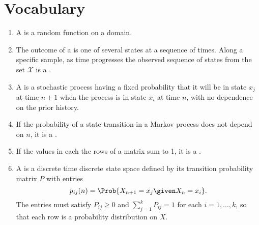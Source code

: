 \documentclass[12pt]{article}
\begin{document}
\section*{Vocabulary}
\begin{enumerate}
    \item
        A  is a random function on a domain.
    \item
        The outcome of a  is one of several states at a sequence of times.  Along
        a specific sample, as time progresses the observed sequence of
        states from the set \( \mathcal{X} \) is a .
    \item
        A  is a stochastic process
        having a fixed probability that it will be in state \( x_j \) at
        time \( n+1 \) when the process is in state \( x_i \) at time \(
        n \), with no dependence on the prior history.
    \item
        If the probability of a state transition in a Markov process
        does not depend on \( n \), it is a .
    \item
        If the values in each the rows of a matrix sum to 1, it is a
        .
    \item
        A  is a discrete time discrete state space
        defined by its transition probability matrix \( P \) with
        entries
        \[
            p_{ij}(n)=\Prob{X_{n+1}=x_j \given X_n=x_i}.
        \] The entries must satisfy \( P_{ij} \ge 0 \) and \( \sum_ {j=1}^k
        P_{ij} = 1 \) for each \( i=1, \dots, k \), so that each row is
        a probability distribution on \( X \). %

\end{enumerate}
\end{document}
